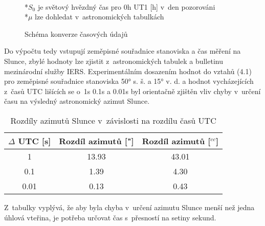 \begin{figure}[H]
    \centering
    \small
    \\
    *\(S_0\) je světový hvězdný čas pro 0h UT1 [h] v~den pozorováni\\
    *\(\mu\) lze dohledat v~astronomických tabulkách
    \caption{Schéma konverze časových údajů}
\end{figure}


Do výpočtu tedy vstupují zeměpisné souřadnice stanoviska a čas měření na Slunce, zbylé hodnoty lze zjistit z~astronomických tabulek a bulletinu mezinárodní služby IERS. Experimentálním dosazením hodnot do vztahů (4.1) pro zeměpisné souřadnice stanoviska 50° s. š. a 15° v. d. a hodnot vycházejících z~časů UTC lišících se o~1s 0.1s a 0.01s byl orientačně zjištěn vliv chyby v~určení času na výsledný astronomický azimut Slunce.


\begin{table}[H]
    \centering
    \caption{Rozdíly azimutů Slunce v~závislosti na rozdílu časů UTC}
    \begin{tabular}{|c|c|c|}
    \hline
    \( \Delta \) UTC [s] & Rozdíl azimutů ["] & Rozdíl azimutů [\(^{cc}\)] \\
    \hline \hline
    1    & 13.93 & 43.01 \\ \hline
    0.1  &  1.39 & 4.30  \\ \hline
    0.01 &  0.13 & 0.43  \\ \hline
    \end{tabular}
\end{table}

Z~tabulky vyplývá, že aby byla chyba v~určení azimutu Slunce menší než jedna úhlová vteřina, je potřeba určovat čas s~přesností na setiny sekund.